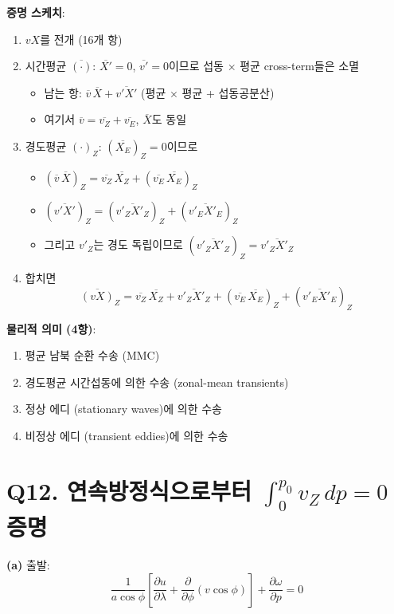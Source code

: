 \documentclass[11pt,a4paper]{article}
\begin{document}
\textbf{증명 스케치}:
\begin{enumerate}
    \item $vX$를 전개 (16개 항)
    \item 시간평균 $\overline{(\cdot)}$: $\overline{X'} = 0$, $\overline{v'} = 0$이므로 섭동 $\times$ 평균 cross-term들은 소멸
    \begin{itemize}
        \item 남는 항: $\overline{v}\,\overline{X} + \overline{v'X'}$ (평균 $\times$ 평균 + 섭동공분산)
        \item 여기서 $\overline{v} = \overline{v_Z}+\overline{v_E}$, $\overline{X}$도 동일
    \end{itemize}
    \item 경도평균 $(\cdot)_Z$: $(\overline{X_E})_Z = 0$이므로
    \begin{itemize}
        \item $(\overline{v}\,\overline{X})_Z = \overline{v_Z}\,\overline{X_Z} + (\overline{v_E}\,\overline{X_E})_Z$
        \item $(\overline{v'X'})_Z = (\overline{v'_Z X'_Z})_Z + (\overline{v'_E X'_E})_Z$
        \item 그리고 $v'_Z$는 경도 독립이므로 $(\overline{v'_Z X'_Z})_Z = \overline{v'_Z X'_Z}$
    \end{itemize}
    \item 합치면
    $$\overline{(vX)}_Z = \overline{v_Z}\,\overline{X_Z} + \overline{v'_Z X'_Z} + (\overline{v_E}\,\overline{X_E})_Z + (\overline{v'_E X'_E})_Z$$
\end{enumerate}

\textbf{물리적 의미 (4항)}:
\begin{enumerate}
    \item 평균 남북 순환 수송 (MMC)
    \item 경도평균 시간섭동에 의한 수송 (zonal-mean transients)
    \item 정상 에디 (stationary waves)에 의한 수송
    \item 비정상 에디 (transient eddies)에 의한 수송
\end{enumerate}

\section*{Q12. 연속방정식으로부터 $\int_0^{p_0} v_Z\,dp = 0$ 증명}

\textbf{(a)} 출발:
$$\frac{1}{a\cos\phi}\left[\frac{\partial u}{\partial \lambda} + \frac{\partial}{\partial \phi}(v\cos\phi)\right] + \frac{\partial \omega}{\partial p} = 0$$
\end{document}

